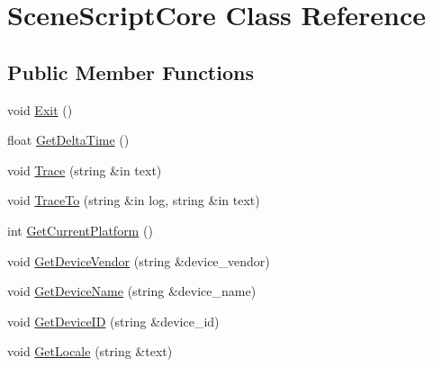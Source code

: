\hypertarget{class_scene_script_core}{}\section{Scene\+Script\+Core Class Reference}
\label{class_scene_script_core}
\subsection*{Public Member Functions}
\begin{DoxyCompactItemize}
\item 
void \hyperlink{class_scene_script_core_aff27ddeada912041d55a4f18c4c6a4e4}{Exit} ()
\item 
float \hyperlink{class_scene_script_core_af943a6a3b9ff21a869f2ba42d6cc288b}{Get\+Delta\+Time} ()
\item 
void \hyperlink{class_scene_script_core_a21423c73600939aaf59af192835d1097}{Trace} (string \&in text)
\item 
void \hyperlink{class_scene_script_core_ad645f7350cf76eece5b0af42434e114c}{Trace\+To} (string \&in log, string \&in text)
\item 
int \hyperlink{class_scene_script_core_a7866b353e904c0f3935d28e625451f82}{Get\+Current\+Platform} ()
\item 
void \hyperlink{class_scene_script_core_a1227ece02df6dcd21b837483a13b7414}{Get\+Device\+Vendor} (string \&device\+\_\+vendor)
\item 
void \hyperlink{class_scene_script_core_a5c342cd6b6d454099d79d07d1d6c6c34}{Get\+Device\+Name} (string \&device\+\_\+name)
\item 
void \hyperlink{class_scene_script_core_ab36d363b006cc650c3733c46ef6d3c48}{Get\+Device\+ID} (string \&device\+\_\+id)
\item 
void \hyperlink{class_scene_script_core_a01cd765be66cde92415f31171d182d9e}{Get\+Locale} (string \&text)
\end{DoxyCompactItemize}
